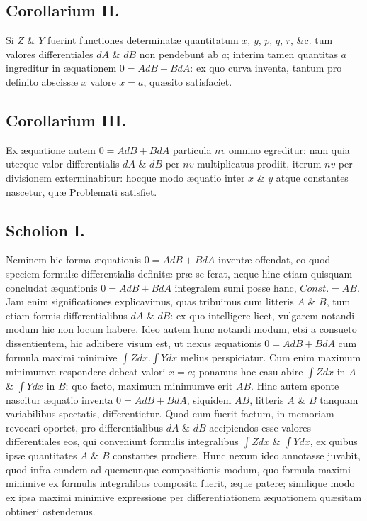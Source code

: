 \subsection*{Corollarium II.}
Si $Z$ \& $Y$ fuerint functiones determinatæ quantitatum $x$, $y$, $p$, $q$, $r$, \&c. tum valores differentiales $dA$ \& $dB$ non pendebunt ab $a$; interim tamen quantitas $a$ ingreditur in æquationem $0=AdB+BdA$: ex quo curva inventa, tantum pro definito abscissæ $x$ valore $x=a$, quæsito satisfaciet.
\subsection*{Corollarium III.}
Ex æquatione autem $0=AdB+BdA$ particula $nv$ omnino egreditur: nam quia uterque valor differentialis $dA$ \& $dB$ per $nv$ multiplicatus prodiit, iterum $nv$ per divisionem exterminabitur: hocque modo æquatio inter $x$ \& $y$ atque constantes nascetur, quæ Problemati satisfiet.
\subsection*{Scholion I.}
Neminem hic forma æquationis $0=AdB+BdA$ inventæ offendat, eo quod speciem formulæ differentialis definitæ præ se ferat, neque hinc etiam quisquam concludat æquationis $0=AdB+BdA$ integralem sumi posse hanc, $\mathit{Const.}=AB$. Jam enim significationes explicavimus, quas tribuimus cum litteris $A$ \& $B$, tum etiam formis differentialibus $dA$ \& $dB$: ex quo intelligere licet, vulgarem notandi modum hic non locum habere. Ideo autem hunc notandi modum, etsi a consueto dissentientem, hic adhibere visum est, ut nexus æquationis $0=AdB+BdA$ cum formula maximi minimive $\int Zdx.\int Ydx$ melius perspiciatur. Cum enim maximum minimumve respondere debeat valori $x=a$; ponamus hoc casu abire $\int Zdx$ in $A$ \& $\int Ydx$ in $B$; quo facto, maximum minimumve erit $AB$. Hinc autem sponte nascitur æquatio inventa $0=AdB+BdA$, siquidem $AB$, litteris $A$ \& $B$ tanquam variabilibus spectatis, differentietur. Quod cum fuerit factum, in memoriam revocari oportet, pro differentialibus $dA$ \& $dB$ accipiendos esse valores differentiales eos, qui conveniunt formulis integralibus $\int Zdx$ \& $\int Ydx$, ex quibus ipsæ quantitates $A$ \& $B$ constantes prodiere. Hunc nexum ideo annotasse juvabit, quod infra eundem ad quemcunque compositionis modum, quo formula maximi minimive ex formulis integralibus composita fuerit, æque patere; similique modo ex ipsa maximi minimive expressione per differentiationem æquationem quæsitam obtineri ostendemus.
